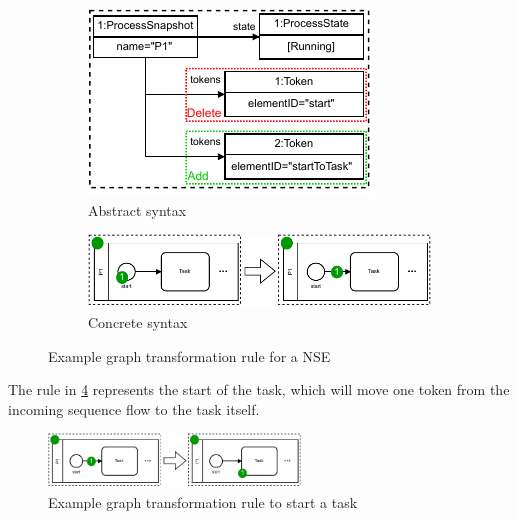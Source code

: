\documentclass[submission, copyright, creativecommons]{eptcs}
\begin{document}
\begin{figure}
\centering
\begin{subfigure}{.3\textwidth}
  \centering
  \includegraphics[width=1\linewidth]{images/rule_abstract.pdf}
  \caption{Abstract syntax}
  \label{fig:gtRuleAbstract}
\end{subfigure}%
\begin{subfigure}{.6\textwidth}
  \centering
  \includegraphics[width=1\linewidth]{images/rule_concrete.pdf}
  \caption{Concrete syntax}
  \label{fig:gtRUleConcrete}
\end{subfigure}
\caption{Example graph transformation rule for a NSE}
\label{fig:gtRule}
\end{figure}

The rule in \cref{fig:taskRules} represents the start of the task, which will move one token from the incoming sequence flow to the task itself.

\begin{figure}[h]
    \centering
    \includegraphics[width=0.6\textwidth]{images/bpmn_semantics-rules.pdf}
    \caption{Example graph transformation rule to start a task}
    \label{fig:taskRules}
\end{figure}
\end{document}
